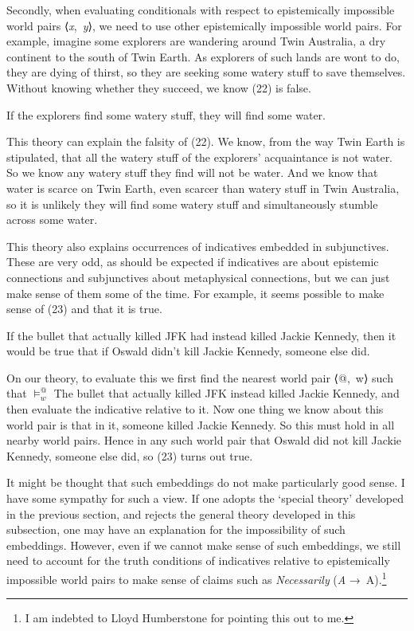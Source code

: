 \documentclass[
  10pt,
  letterpaper,
  DIV=11,
  numbers=noendperiod,
  twoside]{scrartcl}
\providecommand{\tightlist}{%
  \setlength{\itemsep}{0pt}\setlength{\parskip}{0pt}}\usepackage{longtable,booktabs,array}
\begin{document}
Secondly, when evaluating conditionals with respect to epistemically
impossible world pairs ⟨\emph{x},~\emph{y}⟩, we need to use other
epistemically impossible world pairs. For example, imagine some
explorers are wandering around Twin Australia, a dry continent to the
south of Twin Earth. As explorers of such lands are wont to do, they are
dying of thirst, so they are seeking some watery stuff to save
themselves. Without knowing whether they succeed, we know (22) is false.

\begin{description}
\tightlist
\item[(22)]
If the explorers find some watery stuff, they will find some water.
\end{description}

This theory can explain the falsity of (22). We know, from the way Twin
Earth is stipulated, that all the watery stuff of the explorers'
acquaintance is not water. So we know any watery stuff they find will
not be water. And we know that water is scarce on Twin Earth, even
scarcer than watery stuff in Twin Australia, so it is unlikely they will
find some watery stuff and simultaneously stumble across some water.

This theory also explains occurrences of indicatives embedded in
subjunctives. These are very odd, as should be expected if indicatives
are about epistemic connections and subjunctives about metaphysical
connections, but we can just make sense of them some of the time. For
example, it seems possible to make sense of (23) and that it is true.

\begin{description}
\tightlist
\item[(23)]
If the bullet that actually killed JFK had instead killed Jackie
Kennedy, then it would be true that if Oswald didn't kill Jackie
Kennedy, someone else did.
\end{description}

On our theory, to evaluate this we first find the nearest world pair
⟨@,~w⟩ such that \(\vDash_w^@\) The bullet that actually killed JFK
instead killed Jackie Kennedy, and then evaluate the indicative relative
to it. Now one thing we know about this world pair is that in it,
someone killed Jackie Kennedy. So this must hold in all nearby world
pairs. Hence in any such world pair that Oswald did not kill Jackie
Kennedy, someone else did, so (23) turns out true.

It might be thought that such embeddings do not make particularly good
sense. I have some sympathy for such a view. If one adopts the `special
theory' developed in the previous section, and rejects the general
theory developed in this subsection, one may have an explanation for the
impossibility of such embeddings. However, even if we cannot make sense
of such embeddings, we still need to account for the truth conditions of
indicatives relative to epistemically impossible world pairs to make
sense of claims such as \emph{Necessarily} (\emph{A} →~A).\footnote{I am
  indebted to Lloyd Humberstone for pointing this out to me.}
\end{document}
